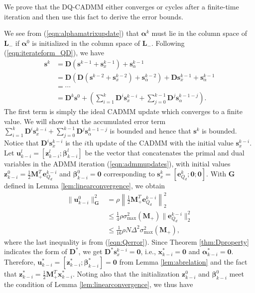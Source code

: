 \documentclass[journal]{IEEEtran}
\newcommand{\nn}{\nonumber}
\begin{document}
\begin{IEEEproof} We prove that the DQ-CADMM either converges or cycles after a finite-time iteration and then use this fact to derive the error bounds.

We see from (\ref{eqn:alphamatrixupdate}) that $\bm\alpha^k$ must lie in the column space of $\bm L_-$ if $\bm\alpha^0$ is initialized in the column space of $\bm L_-$. Following (\ref{eqn:iterateform_QD}), we have 
\begin{align}
\bm s^{k} &= \bm D(\bm s^{k-1}+ \bm s_x^{k-1})+\bm s_\alpha^{k-1}\nn\\
&=\bm D\left(\bm D(\bm s^{k-2}+\bm s_x^{k-2})+\bm s_\alpha^{k-2}\right)+\bm D \bm s_x^{k-1} + \bm s_\alpha^{k-1}\nn\\
&=\cdots\nn\\
\label{eqn:expansion}
&=\bm D^k \bm s^0+\left(\sum_{i=1}^{k} \bm D^i \bm s_x^{k-i}+\sum_{j=0}^{k-1} \bm D^j\bm s_\alpha^{k-1-j}\right).
\end{align}
The first term is simply the ideal CADMM update which converges to a finite value. We will show that the accumulated error term $\sum_{i=1}^{k} \bm D^i \bm s_x^{k-i}+\sum_{j=0}^{k-1} \bm D^j\bm s_\alpha^{k-1-j}$ is bounded and hence that $\bm s^k$ is bounded. Notice that $\bm D^i\bm s_x^{k-i}$ is the $i$th update of the CADMM with the initial value $\bm s_x^{k-i}$. Let $\bm u_{k-i}^l=[\bm z_{k-i}^l;\bm\beta_{k-i}^l]$ be the vector that concatenates the primal and dual variables in the ADMM iteration (\ref{eqn:admmupdates}), with initial values $\bm z_{k-i}^0= \frac{1}{2}\bm M_+^T\bm e^{k-i}_{Q_d}$ and $\bm\beta_{k-i}^0=\bm 0$ corresponding to $\bm s_x^k=[\bm e^k_{Q_d};\bm 0;\bm 0]$. With $\bm G$ defined in Lemma \ref{lem:linearconvergence}, we obtain
\begin{align}
\|\bm u_{k-i}^0\|^2_{\bm G}&=\rho\left\|\frac{1}{2}\bm M_+^T\bm e_{Q_d}^{k-i}\right\|_2^2\nn\\
&\leq\frac{1}{4}\rho\sigma_{\max}^2(\bm M_+)\|\bm e_{Q_d}^{k-i}\|_2^2\nn\\
&\leq \frac{1}{16}\rho N\Delta^2\sigma_{\max}^2(\bm M_+),\nn
\end{align}
where the last inequality is from (\ref{eqn:Qerror}).
Since Theorem \ref{thm:Dproperty} indicates the form of $\bm D^*$, we get $\bm D^* \bm s_x^{k-i}=\bm 0$, i.e., $\bm x_{k-i}^*=\bm 0$ and $\bm\alpha_{k-i}^*=\bm 0$. Therefore, $\bm u_{k-i}^*=[\bm z_{k-i}^*; \bm\beta_{k-i}^*]=\bm 0$ from Lemma \ref{lem:abrelation} and the fact that $\bm z_{k-i}^*=\frac{1}{2}\bm M_+^T\bm x_{k-i}^*$. Noting also that the initialization $\bm z_{k-i}^0$ and $\bm \beta_{k-i}^0$ meet the condition of Lemma \ref{lem:linearconvergence}, we thus have 

\end{IEEEproof}
\end{document}
